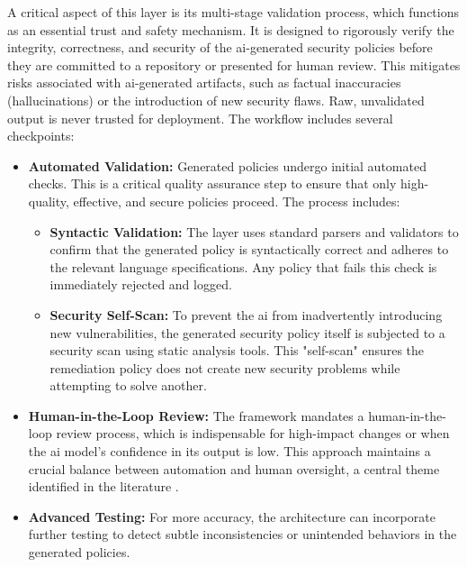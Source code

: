 A critical aspect of this layer is its multi-stage validation process, which functions as an essential trust and safety mechanism. It is designed to rigorously verify the integrity, correctness, and security of the \gls{ai}-generated security policies before they are committed to a repository or presented for human review. This mitigates risks associated with \gls{ai}-generated artifacts, such as factual inaccuracies (hallucinations) or the introduction of new security flaws. Raw, unvalidated output is never trusted for deployment. The workflow includes several checkpoints:

\begin{itemize}
    \item \textbf{Automated Validation:} Generated policies undergo initial automated checks. This is a critical quality assurance step to ensure that only high-quality, effective, and secure policies proceed. The process includes:
        \begin{itemize}
            \item \textbf{Syntactic Validation:} The layer uses standard parsers and validators to confirm that the generated policy is syntactically correct and adheres to the relevant language specifications. Any policy that fails this check is immediately rejected and logged.
            \item \textbf{Security Self-Scan:} To prevent the \gls{ai} from inadvertently introducing new vulnerabilities, the generated security policy itself is subjected to a security scan using static analysis tools. This "self-scan" ensures the remediation policy does not create new security problems while attempting to solve another.
        \end{itemize}

    \item \textbf{Human-in-the-Loop Review:} The framework mandates a human-in-the-loop review process, which is indispensable for high-impact changes or when the \gls{ai} model's confidence in its output is low. This approach maintains a crucial balance between automation and human oversight, a central theme identified in the literature \cite{lim_explicate_2025}.
    
    \item \textbf{Advanced Testing:} For more accuracy, the architecture can incorporate further testing to detect subtle inconsistencies or unintended behaviors in the generated policies.
\end{itemize}

